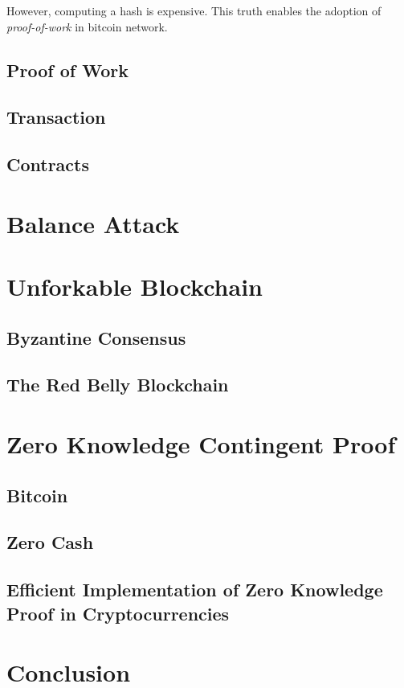 \documentclass[12pt]{article}
\begin{document}
However, computing a hash is expensive. This truth enables the adoption of 
\textit{proof-of-work} in bitcoin network.

\subsection{Proof of Work}


\subsection{Transaction}


\subsection{Contracts}


\section{Balance Attack}
\label{sec:Balance Attack}


\section{Unforkable Blockchain}
\label{sec:Unforkable Blockchain}

\subsection{Byzantine Consensus}

\subsection{The Red Belly Blockchain}

\section{Zero Knowledge Contingent Proof}
\label{sec:Zero Knowledge Contingent Proof}

\subsection{Bitcoin}

\subsection{Zero Cash}

\subsection{Efficient Implementation of Zero Knowledge Proof in Cryptocurrencies}

\section{Conclusion}

\newpage


\end{document}
